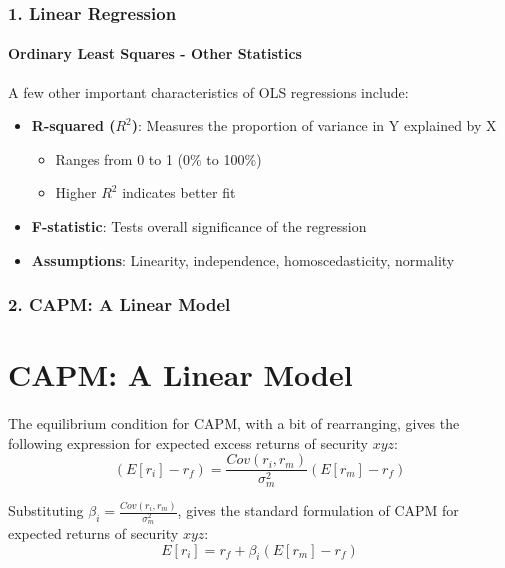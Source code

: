 \documentclass{beamer}
\begin{document}
\begin{foundframe}[t]
    \frametitle{1. Linear Regression}
    \framesubtitle{Ordinary Least Squares - Other Statistics}

    A few other important characteristics of OLS regressions include:
    \begin{itemize}
        \item \textbf{R-squared ($R^2$)}: Measures the proportion of variance in Y explained by X
            \begin{itemize}
                \item Ranges from 0 to 1 (0\% to 100\%)
                \item Higher $R^2$ indicates better fit
            \end{itemize}
        \item \textbf{F-statistic}: Tests overall significance of the regression
        \item \textbf{Assumptions}: Linearity, independence, homoscedasticity, normality
    \end{itemize}

\end{foundframe}

\begin{frame}[t]
    \frametitle{2. CAPM: A Linear Model}
    \section{CAPM: A Linear Model}
    \framesubtitle{}

    The equilibrium condition for CAPM, with a bit of rearranging, gives the following 
    expression for expected excess returns of security $xyz$:
    $$(E[r_i]-r_f) = \frac{Cov(r_i,r_m)}{\sigma_m^2}(E[r_m]-r_f)$$

    Substituting $\beta_i = \frac{Cov(r_i,r_m)}{\sigma_m^2}$, gives the standard 
    formulation of CAPM for expected returns of security $xyz$:\\
    $$\boxed{E[r_i] = r_f + \beta_i(E[r_m] - r_f)}$$\\
    \vspace{1em} 



\end{frame}
\end{document}
